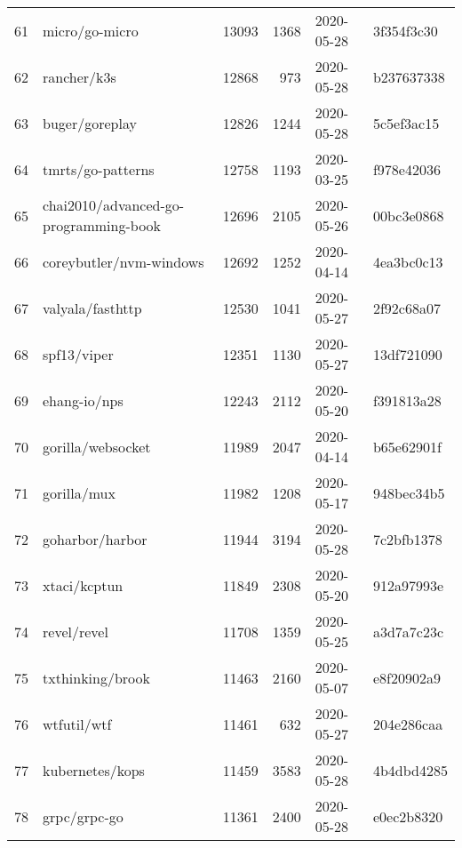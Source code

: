 \begin{longtable}{llrrll}
    61  &                                     micro/go-micro &  13093 &   1368 & 2020-05-28 &  3f354f3c30 \\
    62  &                                        rancher/k3s &  12868 &    973 & 2020-05-28 &  b237637338 \\
    63  &                                     buger/goreplay &  12826 &   1244 & 2020-05-28 &  5c5ef3ac15 \\
    64  &                                  tmrts/go-patterns &  12758 &   1193 & 2020-03-25 &  f978e42036 \\
    65  &              chai2010/advanced-go-programming-book &  12696 &   2105 & 2020-05-26 &  00bc3e0868 \\
    66  &                            coreybutler/nvm-windows &  12692 &   1252 & 2020-04-14 &  4ea3bc0c13 \\
    67  &                                   valyala/fasthttp &  12530 &   1041 & 2020-05-27 &  2f92c68a07 \\
    68  &                                        spf13/viper &  12351 &   1130 & 2020-05-27 &  13df721090 \\
    69  &                                       ehang-io/nps &  12243 &   2112 & 2020-05-20 &  f391813a28 \\
    70  &                                  gorilla/websocket &  11989 &   2047 & 2020-04-14 &  b65e62901f \\
    71  &                                        gorilla/mux &  11982 &   1208 & 2020-05-17 &  948bec34b5 \\
    72  &                                    goharbor/harbor &  11944 &   3194 & 2020-05-28 &  7c2bfb1378 \\
    73  &                                       xtaci/kcptun &  11849 &   2308 & 2020-05-20 &  912a97993e \\
    74  &                                        revel/revel &  11708 &   1359 & 2020-05-25 &  a3d7a7c23c \\
    75  &                                   txthinking/brook &  11463 &   2160 & 2020-05-07 &  e8f20902a9 \\
    76  &                                        wtfutil/wtf &  11461 &    632 & 2020-05-27 &  204e286caa \\
    77  &                                    kubernetes/kops &  11459 &   3583 & 2020-05-28 &  4b4dbd4285 \\
    78  &                                       grpc/grpc-go &  11361 &   2400 & 2020-05-28 &  e0ec2b8320 \\

\end{longtable}
